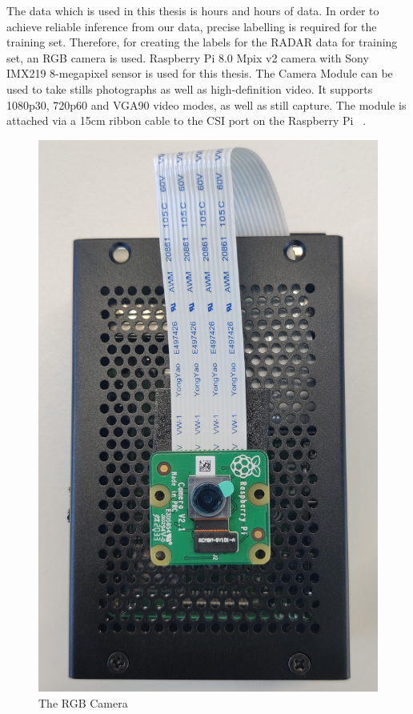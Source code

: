 The data which is used in this thesis is hours and hours of data. In order to achieve reliable inference from our data, precise labelling is required for the training set. Therefore, for creating the labels for the RADAR data for training set, an RGB camera is used. Raspberry Pi 8.0 Mpix v2 camera with Sony IMX219 8-megapixel sensor is used for this thesis. The Camera Module can be used to take stills photographs as well as high-definition video. It supports 1080p30, 720p60 and VGA90 video modes, as well as still capture. The module is attached via a 15cm ribbon cable to the CSI port on the Raspberry Pi ~\cite{raspberrypi}.
\begin{figure}[ht]
  \begin{center}
    \includegraphics[scale = 0.07]{Master's thesis/images/RGB_camera.jpg} 
    \caption{The RGB Camera}
    \label{fig:AoA}
  \end{center}
\end{figure}  
